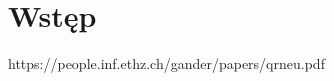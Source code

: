 \documentclass[11pt, wide, leqno]{mwart}
\begin{document}
\maketitle
\tableofcontents

\section{Wstęp}

https://people.inf.ethz.ch/gander/papers/qrneu.pdf
\end{document}
